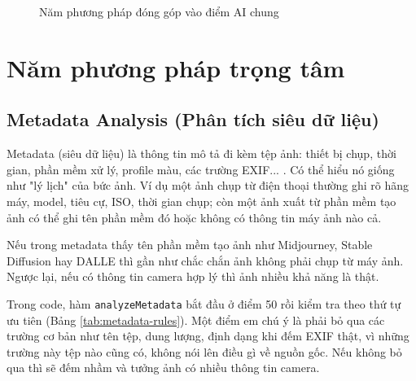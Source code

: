 \begin{figure}[H]
\centering
{}
\caption{Năm phương pháp đóng góp vào điểm AI chung}
\label{fig:five-methods}
\end{figure}

\section{Năm phương pháp trọng tâm}

\subsection{Metadata Analysis (Phân tích siêu dữ liệu)}
Metadata (siêu dữ liệu) là thông tin mô tả đi kèm tệp ảnh: thiết bị chụp, thời gian, phần mềm xử lý, profile màu, các trường EXIF... \cite{farid,c2pa}. Có thể hiểu nó giống như "lý lịch" của bức ảnh. Ví dụ một ảnh chụp từ điện thoại thường ghi rõ hãng máy, model, tiêu cự, ISO, thời gian chụp; còn một ảnh xuất từ phần mềm tạo ảnh có thể ghi tên phần mềm đó hoặc không có thông tin máy ảnh nào cả.

Nếu trong metadata thấy tên phần mềm tạo ảnh như Midjourney, Stable Diffusion hay DALL\textperiodcentered E thì gần như chắc chắn ảnh không phải chụp từ máy ảnh. Ngược lại, nếu có thông tin camera hợp lý thì ảnh nhiều khả năng là thật.

Trong code, hàm \texttt{analyzeMetadata} bắt đầu ở điểm 50 rồi kiểm tra theo thứ tự ưu tiên (Bảng \ref{tab:metadata-rules}). Một điểm em chú ý là phải bỏ qua các trường cơ bản như tên tệp, dung lượng, định dạng khi đếm EXIF thật, vì những trường này tệp nào cũng có, không nói lên điều gì về nguồn gốc. Nếu không bỏ qua thì sẽ đếm nhầm và tưởng ảnh có nhiều thông tin camera.

